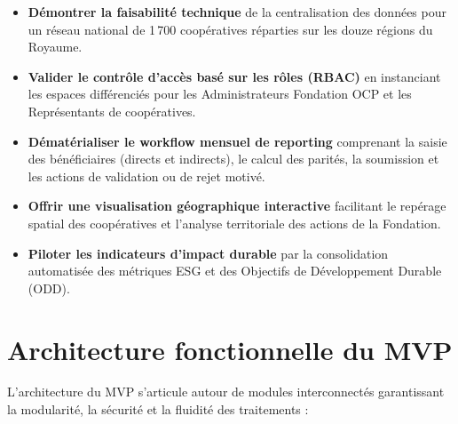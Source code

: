 \begin{itemize}
    \item \textbf{Démontrer la faisabilité technique} de la centralisation des données pour un réseau national de 1\,700 coopératives réparties sur les douze régions du Royaume.
    \item \textbf{Valider le contrôle d'accès basé sur les rôles (RBAC)} en instanciant les espaces différenciés pour les Administrateurs Fondation OCP et les Représentants de coopératives.
    \item \textbf{Dématérialiser le workflow mensuel de reporting} comprenant la saisie des bénéficiaires (directs et indirects), le calcul des parités, la soumission et les actions de validation ou de rejet motivé.
    \item \textbf{Offrir une visualisation géographique interactive} facilitant le repérage spatial des coopératives et l'analyse territoriale des actions de la Fondation.
    \item \textbf{Piloter les indicateurs d'impact durable} par la consolidation automatisée des métriques ESG et des Objectifs de Développement Durable (ODD).
\end{itemize}

\section{Architecture fonctionnelle du MVP}

L'architecture du MVP s'articule autour de modules interconnectés garantissant la modularité, la sécurité et la fluidité des traitements :


